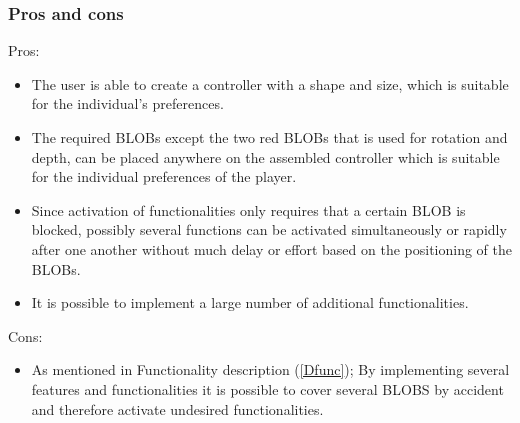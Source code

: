 \subsubsection*{Pros and cons}
Pros:
\begin{itemize}
\item The user is able to create a controller with a shape and size, which is suitable for the individual’s preferences.
\item The required BLOBs except the two red BLOBs that is used for rotation and depth, can be placed anywhere on the assembled controller which is suitable for the individual preferences of the player. 
\item Since activation of functionalities only requires that a certain BLOB is blocked, possibly several functions can be activated simultaneously or rapidly after one another without much delay or effort based on the positioning of the BLOBs.
\item It is possible to implement a large number of additional functionalities.
\end{itemize}
Cons:
\begin{itemize}
\item As mentioned in Functionality description (\ref{Dfunc}); By implementing several features and functionalities it is possible to cover several BLOBS by accident and therefore activate undesired functionalities.
\end{itemize}
